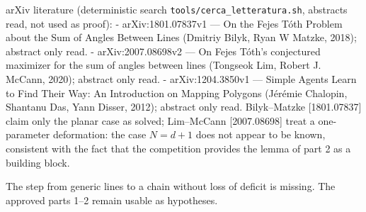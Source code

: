 arXiv literature (deterministic search
\texttt{tools/cerca\_letteratura.sh}, abstracts read, not used as
proof): - arXiv:1801.07837v1 --- On the Fejes Tóth Problem about the Sum
of Angles Between Lines (Dmitriy Bilyk, Ryan W Matzke, 2018); abstract
only read. - arXiv:2007.08698v2 --- On Fejes Tóth's conjectured
maximizer for the sum of angles between lines (Tongseok Lim, Robert J.
McCann, 2020); abstract only read. - arXiv:1204.3850v1 --- Simple Agents
Learn to Find Their Way: An Introduction on Mapping Polygons (Jérémie
Chalopin, Shantanu Das, Yann Disser, 2012); abstract only read.
Bilyk--Matzke {[}1801.07837{]} claim only the planar case as solved;
Lim--McCann {[}2007.08698{]} treat a one-parameter deformation: the case
\(N=d+1\) does not appear to be known, consistent with the fact that the
competition provides the lemma of part 2 as a building block.


The step from generic lines to a chain without loss of deficit is
missing. The approved parts 1--2 remain usable as hypotheses.

